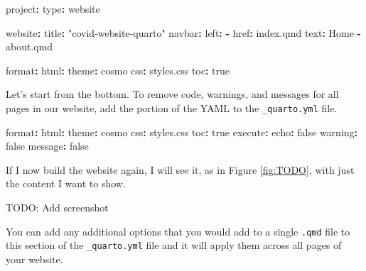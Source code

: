 \documentclass[
]{book}
\newenvironment{Shaded}{\begin{snugshade}}{\end{snugshade}}
\newcommand{\AttributeTok}[1]{\textcolor[rgb]{0.77,0.63,0.00}{#1}}
\newcommand{\CharTok}[1]{\textcolor[rgb]{0.31,0.60,0.02}{#1}}
\newcommand{\FunctionTok}[1]{\textcolor[rgb]{0.00,0.00,0.00}{#1}}
\newcommand{\KeywordTok}[1]{\textcolor[rgb]{0.13,0.29,0.53}{\textbf{#1}}}
\newcommand{\StringTok}[1]{\textcolor[rgb]{0.31,0.60,0.02}{#1}}
\begin{document}
\begin{Shaded}
\begin{Highlighting}[]
\FunctionTok{project}\KeywordTok{:}
\AttributeTok{  }\FunctionTok{type}\KeywordTok{:}\AttributeTok{ website}

\FunctionTok{website}\KeywordTok{:}
\AttributeTok{  }\FunctionTok{title}\KeywordTok{:}\AttributeTok{ }\StringTok{"covid{-}website{-}quarto"}
\AttributeTok{  }\FunctionTok{navbar}\KeywordTok{:}
\AttributeTok{    }\FunctionTok{left}\KeywordTok{:}
\AttributeTok{      }\KeywordTok{{-}}\AttributeTok{ }\FunctionTok{href}\KeywordTok{:}\AttributeTok{ index.qmd}
\AttributeTok{        }\FunctionTok{text}\KeywordTok{:}\AttributeTok{ Home}
\AttributeTok{      }\KeywordTok{{-}}\AttributeTok{ about.qmd}

\FunctionTok{format}\KeywordTok{:}
\AttributeTok{  }\FunctionTok{html}\KeywordTok{:}
\AttributeTok{    }\FunctionTok{theme}\KeywordTok{:}\AttributeTok{ cosmo}
\AttributeTok{    }\FunctionTok{css}\KeywordTok{:}\AttributeTok{ styles.css}
\AttributeTok{    }\FunctionTok{toc}\KeywordTok{:}\AttributeTok{ }\CharTok{true}
\end{Highlighting}
\end{Shaded}

Let's start from the bottom. To remove code, warnings, and messages for all pages in our website, add the portion of the YAML to the \texttt{\_quarto.yml} file.

\begin{Shaded}
\begin{Highlighting}[]
\FunctionTok{format}\KeywordTok{:}
\AttributeTok{  }\FunctionTok{html}\KeywordTok{:}
\AttributeTok{    }\FunctionTok{theme}\KeywordTok{:}\AttributeTok{ cosmo}
\AttributeTok{    }\FunctionTok{css}\KeywordTok{:}\AttributeTok{ styles.css}
\AttributeTok{    }\FunctionTok{toc}\KeywordTok{:}\AttributeTok{ }\CharTok{true}
\FunctionTok{execute}\KeywordTok{:}\AttributeTok{ }
\AttributeTok{  }\FunctionTok{echo}\KeywordTok{:}\AttributeTok{ }\CharTok{false}
\AttributeTok{  }\FunctionTok{warning}\KeywordTok{:}\AttributeTok{ }\CharTok{false}
\AttributeTok{  }\FunctionTok{message}\KeywordTok{:}\AttributeTok{ }\CharTok{false}
\end{Highlighting}
\end{Shaded}

If I now build the website again, I will see it, as in Figure \ref{fig:TODO}, with just the content I want to show.

TODO: Add screenshot

You can add any additional options that you would add to a single \texttt{.qmd} file to this section of the \texttt{\_quarto.yml} file and it will apply them across all pages of your website.
\end{document}
